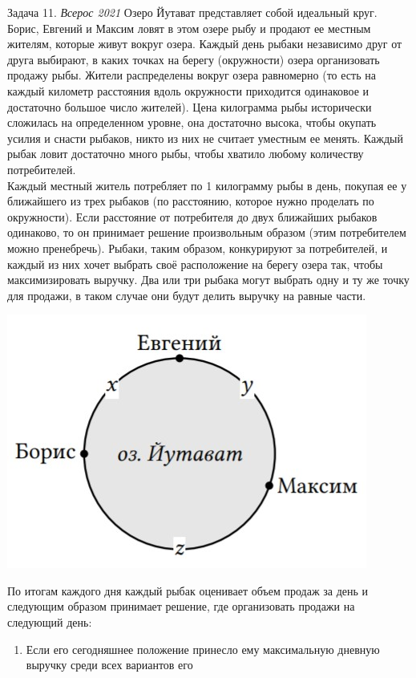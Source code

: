 \begin{mybox}{Задача 11. \textit{Всерос 2021}}
    \indent\setlength{\parindent}{1em}\indent\setlength{\parindent}{1em}Озеро Йутават представляет собой идеальный
    круг. Борис, Евгений и Максим ловят в этом озере рыбу и продают ее местным жителям, которые живут вокруг озера.
    Каждый день рыбаки независимо друг от друга выбирают, в каких точках на берегу (окружности) озера организовать
    продажу рыбы. Жители распределены вокруг озера равномерно (то есть на каждый километр расстояния вдоль окружности
    приходится одинаковое и достаточно большое число жителей). Цена килограмма рыбы исторически сложилась на
    определенном уровне, она достаточно высока, чтобы окупать усилия и снасти рыбаков, никто из них не считает
    уместным ее менять. Каждый рыбак ловит достаточно много рыбы, чтобы хватило любому количеству потребителей.\\
    \indent\setlength{\parindent}{1em}Каждый местный житель потребляет по 1 килограмму рыбы в день, покупая ее у
    ближайшего из трех рыбаков (по расстоянию, которое нужно проделать по окружности). Если расстояние от потребителя
    до двух ближайших рыбаков одинаково, то он принимает решение произвольным образом (этим потребителем можно
    пренебречь). Рыбаки, таким образом, конкурируют за потребителей, и каждый из них хочет выбрать своё расположение
    на берегу озера так, чтобы максимизировать выручку. Два или три рыбака могут выбрать одну и ту же точку для
    продажи, в таком случае они будут делить выручку на равные части.
    \begin{center}
        \includegraphics[width=0.5\linewidth]{static/4_11}
    \end{center}
    \indent\setlength{\parindent}{1em}\indent\setlength{\parindent}{1em}По итогам каждого дня каждый рыбак оценивает
    объем продаж за день и следующим образом принимает решение, где организовать продажи на следующий день:
    \begin{enumerate}
        \item Если его сегодняшнее положение принесло ему максимальную дневную выручку среди всех вариантов его

\end{enumerate}
\end{mybox}

